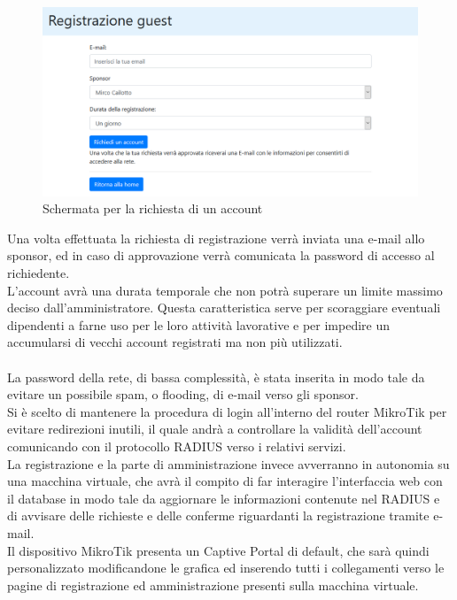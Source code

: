 \documentclass[Realizzazione.tex]{subfiles}
\begin{document}
\begin{figure}[H]
	\centering
	\includegraphics[width=1.1\linewidth]{"images/CaptivePortalReq"}
	\caption{Schermata per la richiesta di un account}
	\label{fig:Schermata per la richiesta di un account}
\end{figure}

Una volta effettuata la richiesta di registrazione verrà inviata una e-mail allo sponsor, ed in caso di approvazione verrà comunicata la password di accesso al richiedente. \\
L'account avrà una durata temporale che non potrà superare un limite massimo deciso dall'amministratore. Questa caratteristica serve per scoraggiare eventuali dipendenti a farne uso per le loro attività lavorative e per impedire un accumularsi di vecchi account registrati ma non più utilizzati. \\\\
La password della rete, di bassa complessità, è stata inserita in modo tale da evitare un possibile spam, o flooding, di e-mail verso gli sponsor. \\

Si è scelto di mantenere la procedura di login all'interno del router MikroTik per evitare redirezioni inutili, il quale andrà a controllare la validità dell'account comunicando con il protocollo RADIUS verso i relativi servizi. \\
La registrazione e la parte di amministrazione invece avverranno in autonomia su una macchina virtuale, che avrà il compito di far interagire l'interfaccia web con il database in modo tale da aggiornare le informazioni contenute nel RADIUS e di avvisare delle richieste e delle conferme riguardanti la registrazione tramite e-mail. \\

Il dispositivo MikroTik presenta un Captive Portal di default, che sarà quindi personalizzato modificandone le grafica ed inserendo tutti i collegamenti verso le pagine di registrazione ed amministrazione presenti sulla macchina virtuale. \\
\end{document}
